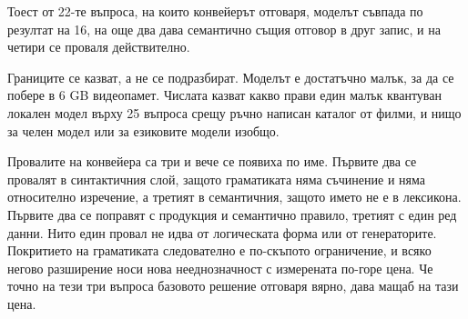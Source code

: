 Тоест от 22-те въпроса, на които конвейерът отговаря, моделът съвпада по резултат на 16,
на още два дава семантично същия отговор в друг запис, и на четири се проваля
действително.

Границите се казват, а не се подразбират. Моделът е достатъчно малък, за да се побере в
6 GB видеопамет. Числата казват какво прави един малък квантуван локален модел върху 25
въпроса срещу ръчно написан каталог от филми, и нищо за челен модел или за езиковите
модели изобщо.

Провалите на конвейера са три и вече се появиха по име. Първите два се провалят в
синтактичния слой, защото граматиката няма съчинение и няма относително изречение, а
третият в семантичния, защото името не е в лексикона. Първите два се поправят с продукция
и семантично правило, третият с един ред данни. Нито един провал не идва от логическата
форма или от генераторите. Покритието на граматиката следователно е по-скъпото
ограничение, и всяко негово разширение носи нова нееднозначност с измерената по-горе цена.
Че точно на тези три въпроса базовото решение отговаря вярно, дава мащаб на тази цена.
